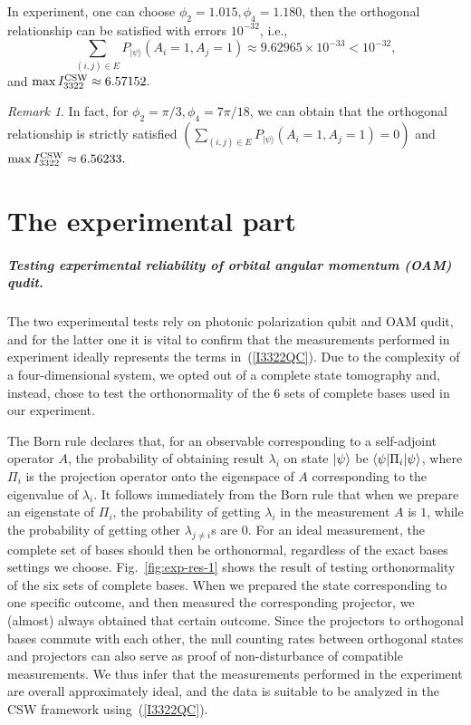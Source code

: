 \documentclass[pra,aps,notitlepage,superscriptaddress,showpacs,showkeys]{revtex4-1}
\theoremstyle{definition}
\theoremstyle{remark}
\newtheorem{remark}{Remark}
\begin{document}
In experiment, one can choose $\phi_{2}= 1.015,\phi_{4}= 1.180$, then the orthogonal relationship can be satisfied with errors $10^{-32}$, i.e.,
$$\sum_{(i,j)\in E}P_{|\psi\rangle}(A_i=1,A_j=1)\approx 9.62965\times 10^{-33}<10^{-32},$$
and $\max I_{3322}^{\rm CSW}\approx 6.57152.$



\begin{remark}
In fact, for $\phi_{2}= \pi/3,\phi_{4}=7\pi/18$, we can obtain that the orthogonal relationship is strictly satisfied  $(\sum_{(i,j)\in E}P_{|\psi\rangle}(A_i=1,A_j=1)=0)$ and $\max I_{3322}^{\rm CSW}\approx 6.56233.$
\end{remark}

\section{The experimental part}

\subparagraph{Testing experimental reliability of orbital angular momentum (OAM) qudit.}
The two experimental tests rely on photonic polarization qubit and OAM qudit, and for the latter one it is vital to confirm that the measurements performed in experiment ideally represents the terms in~(\ref{I3322QC}).
Due to the complexity of a four-dimensional system, we opted out of a complete state tomography and, instead, chose to test the orthonormality of the 6 sets of complete bases used in our experiment.

The Born rule declares that, for an observable corresponding to a self-adjoint operator $A$, the probability of obtaining result $\lambda_i$ on state $\ket{\psi}$ be $\braket{\psi|\Pi_i|\psi}$, where $\Pi_i$ is the projection operator onto the eigenspace of $A$ corresponding to the eigenvalue of $\lambda_i$.
It follows immediately from the Born rule that when we prepare an eigenstate of $\Pi_i$, the probability of getting $\lambda_i$ in the measurement $A$ is $1$, while the probability of getting other $\lambda_{j\neq i}$s are $0$.
For an ideal measurement, the complete set of bases should then be orthonormal, regardless of the exact bases settings we choose.
Fig.~\ref{fig:exp-res-1} shows the result of testing orthonormality of the six sets of complete bases. When we prepared the state corresponding to one specific outcome, and then measured the corresponding projector, we (almost) always obtained that certain outcome.
Since the projectors to orthogonal bases commute with each other, the null counting rates between orthogonal states and projectors can also serve as proof of non-disturbance of compatible measurements.
We thus infer that the measurements performed in the experiment are overall approximately ideal, and the data is suitable to be analyzed in the CSW framework using~(\ref{I3322QC}).
\end{document}
